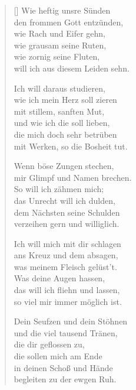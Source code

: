 \begin{multicols}{2}
\begin{verse}[\versewidth]
 Wie heftig unsre Sünden\\
den frommen Gott entzünden,\\
wie Rach und Eifer gehn,\\
wie grausam seine Ruten,\\
wie zornig seine Fluten,\\
will ich aus diesem Leiden sehn.

 Ich will daraus studieren,\\
wie ich mein Herz soll zieren\\
mit stillem, sanften Mut,\\
und wie ich die soll lieben,\\
die mich doch sehr betrüben\\
mit Werken, so die Bosheit tut.

 Wenn böse Zungen stechen,\\
mir Glimpf und Namen brechen.\\
So will ich zähmen mich;\\
das Unrecht will ich dulden,\\
dem Nächsten seine Schulden\\
verzeihen gern und williglich.

 Ich will mich mit dir schlagen\\
ans Kreuz und dem absagen,\\
was meinem Fleisch gelüst't.\\
Was deine Augen hassen,\\
das will ich fliehn und lassen,\\
so viel mir immer möglich ist.

 Dein Seufzen und dein Stöhnen\\
und die viel tausend Tränen,\\
die dir geflossen zu,\\
die sollen mich am Ende\\
in deinen Schoß und Hände\\
begleiten zu der ewgen Ruh.

\end{verse}
\end{multicols}
